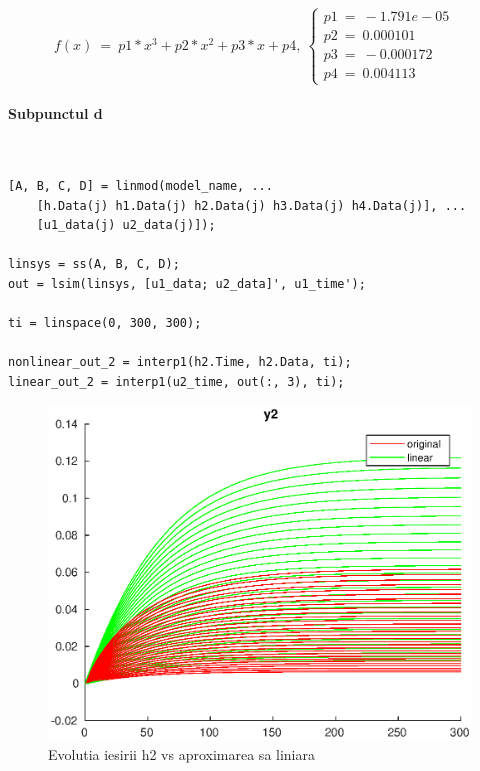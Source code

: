 \documentclass[12pt,english]{article}
\newcommand{\myparagraph}[1]{\paragraph{#1}\mbox{}\\}
\begin{document}
\begin{equation*}
f( x) \ =\ p1*x^{3} +p2*x^{2} +p3*x+p4,\ \begin{cases}
p1\ =\ -1.791e-05 & \\
p2\ =\ 0.000101 & \\
p3\ =\ -0.000172 & \\
p4\ =\ 0.004113 & 
\end{cases}
\end{equation*}

\myparagraph {Subpunctul d}

\begin{verbatim}
[A, B, C, D] = linmod(model_name, ...
	[h.Data(j) h1.Data(j) h2.Data(j) h3.Data(j) h4.Data(j)], ...
	[u1_data(j) u2_data(j)]);

linsys = ss(A, B, C, D);
out = lsim(linsys, [u1_data; u2_data]', u1_time');

ti = linspace(0, 300, 300);

nonlinear_out_2 = interp1(h2.Time, h2.Data, ti);
linear_out_2 = interp1(u2_time, out(:, 3), ti);
\end{verbatim}

\begin{figure} [H]
	\includegraphics[width=1\textwidth]{d_1.eps}
	\caption{Evolutia iesirii h2 vs aproximarea sa liniara}
\end{figure}
\end{document}
